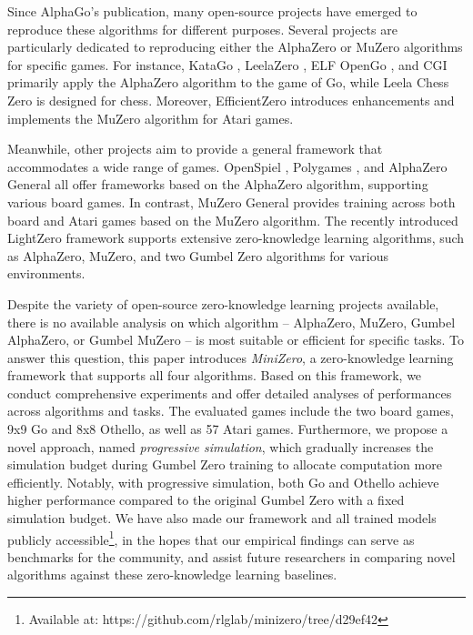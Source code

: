 Since AlphaGo's publication, many open-source projects have emerged to reproduce these algorithms for different purposes.
Several projects are particularly dedicated to reproducing either the AlphaZero or MuZero algorithms for specific games.
For instance, KataGo \cite{wu_accelerating_2020a}, LeelaZero \cite{pascutto_leela_2023}, ELF OpenGo \cite{tian_elf_2019}, and CGI \cite{wu_accelerating_2020} primarily apply the AlphaZero algorithm to the game of Go, while Leela Chess Zero \cite{gary_leela_2023} is designed for chess.
Moreover, EfficientZero \cite{ye_mastering_2021} introduces enhancements and implements the MuZero algorithm for Atari games.

Meanwhile, other projects aim to provide a general framework that accommodates a wide range of games.
OpenSpiel \cite{lanctot_openspiel_2020}, Polygames \cite{cazenave_polygames_2020}, and AlphaZero General \cite{thakoor_learning_2016} all offer frameworks based on the AlphaZero algorithm, supporting various board games.
In contrast, MuZero General \cite{wernerduvaud_muzero_2019} provides training across both board and Atari games based on the MuZero algorithm.
The recently introduced LightZero \cite{niu2023lightzero} framework supports extensive zero-knowledge learning algorithms, such as AlphaZero, MuZero, and two Gumbel Zero algorithms for various environments.

Despite the variety of open-source zero-knowledge learning projects available, there is no available analysis on which algorithm -- AlphaZero, MuZero, Gumbel AlphaZero, or Gumbel MuZero -- is most suitable or efficient for specific tasks.
To answer this question, this paper introduces \textit{MiniZero}, a zero-knowledge learning framework that supports all four algorithms.
Based on this framework, we conduct comprehensive experiments and offer detailed analyses of performances across algorithms and tasks.
The evaluated games include the two board games, 9x9 Go and 8x8 Othello, as well as 57 Atari games.
Furthermore, we propose a novel approach, named \textit{progressive simulation}, which gradually increases the simulation budget during Gumbel Zero training to allocate computation more efficiently.
Notably, with progressive simulation, both Go and Othello achieve higher performance compared to the original Gumbel Zero with a fixed simulation budget.
We have also made our framework and all trained models publicly accessible\footnote{Available at: https://github.com/rlglab/minizero/tree/d29ef42}, in the hopes that our empirical findings can serve as benchmarks for the community, and assist future researchers in comparing novel algorithms against these zero-knowledge learning baselines.


